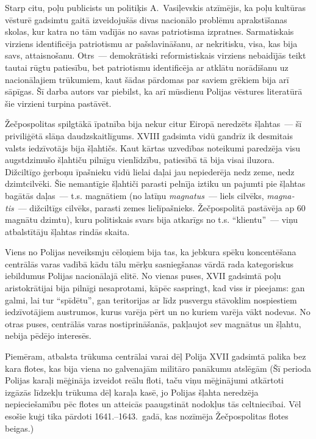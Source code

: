\documentclass[twoside,a5paper,12pt,fleqn,openany]{extbook}
\newcommand{\latxti}[1]{\textit{\textlatin{#1}}}
\begin{document}
Starp citu, poļu publicists un politiķis A.~Vasiļevskis atzīmējis, ka poļu kultūras vēsturē gadsimtu gaitā izveidojušās divas nacionālo problēmu aprakstīšanas skolas, kur katra no tām vadījās no savas patriotisma izpratnes. Sarmatiskais virziens identificēja patriotismu ar pašslavināšanu, ar nekritisku, visa, kas bija savs, attaisnošanu. Otrs~--- demokrātiski reformistiskais virziens nebaidījās teikt tautai rūgtu patiesību, bet patriotismu identificēja ar atklātu norādīšanu uz nacionālajiem trūkumiem, kaut šādas pārdomas par saviem grēkiem bija arī sāpīgas. Šī darba autors var piebilst, ka arī mūsdienu Polijas vēstures literatūrā šie virzieni turpina pastāvēt.

Žečpospolitas spilgtākā īpatnība bija nekur citur Eiropā neredzēts šļahtas~--- šī priviliģētā slāņa daudzskaitlīgums. XVIII gadsimta vidū gandrīz ik desmitais valsts iedzīvotājs bija šļahtičs. Kaut kārtas uzvedības noteikumi paredzēja visu augstdzimušo šļahtiču pilnīgu vienlīdzību, patiesībā tā bija visai iluzora. Dižciltīgo ģerboņu īpašnieku vidū lielai daļai jau nepiederēja nedz zeme, nedz dzimtcilvēki. Šie nemantīgie šļahtiči parasti pelnīja iztiku un pajumti pie šļahtas bagātās daļas~--- t.s. magnātiem (no latīņu \latxti{magnatus}~--- liels cilvēks, \latxti{magnatis}~--- dižciltīgs cilvēks, parasti zemes lielīpašnieks. Žečpospolitā pastāvēja ap 60 magnātu dzimtu), kuru politiskais svars bija atkarīgs no t.s. ``klientu''~--- viņu atbalstītāju šļahtas rindās skaita.

Viens no Polijas neveiksmju cēloņiem bija tas, ka jebkura spēku koncentēšana centrālās varas vadībā kādu tālu mērķu sasniegšanas vārdā rada kategoriskus iebildumus Polijas nacionālajā elitē. No vienas puses, XVII gadsimtā poļu aristokrātijai bija pilnīgi nesaprotami, kāpēc saspringt, kad viss ir pieejams: gan galmi, lai tur ``spīdētu'', gan teritorijas ar līdz pusvergu stāvoklim nospiestiem iedzīvotājiem austrumos, kurus varēja pērt un no kuriem varēja vākt nodevas. No otras puses, centrālās varas nostiprināšanās, pakļaujot sev magnātus un šļahtu, nebija pēdējo interesēs.

Piemēram, atbalsta trūkuma centrālai varai dēļ Polija XVII gadsimtā palika bez kara flotes, kas bija viena no galvenajām militāro panākumu atslēgām (Šī perioda Polijas karaļi mēģināja izveidot reālu floti, taču viņu mēģinājumi atkārtoti izgāzās līdzekļu trūkuma dēļ karaļa kasē, jo Polijas šļahta neredzēja nepieciešamību pēc flotes un atteicās paaugstināt nodokļus tās celtniecībai. Vēl esošie kuģi tika pārdoti 1641.--1643.~gadā, kas nozīmēja Žečpospolitas flotes beigas.)
\end{document}
